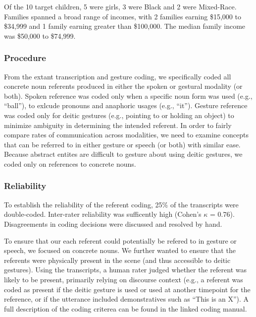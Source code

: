 \documentclass[english,,man,floatsintext]{apa6}
\begin{document}
Of the 10 target children, 5 were girls, 3 were Black and 2 were Mixed-Race. Families spanned a broad range of incomes, with 2 families earning \$15,000 to \$34,999 and 1 family earning greater than \$100,000. The median family income was \$50,000 to \$74,999.

\hypertarget{procedure}{%
\subsubsection{Procedure}\label{procedure}}

From the extant transcription and gesture coding, we specifically coded all concrete noun referents produced in either the spoken or gestural modality (or both). Spoken reference was coded only when a specific noun form was used (e.g., \enquote{ball}), to exlcude pronouns and anaphoric usages (e.g., \enquote{it}). Gesture reference was coded only for deitic gestures (e.g., pointing to or holding an object) to minimize ambiguity in determining the intended referent. In order to fairly compare rates of communication across modalities, we need to examine concepts that can be referred to in either gesture or speech (or both) with similar ease. Because abstract entites are difficult to gesture about using deitic gestures, we coded only on references to concrete nouns.

\hypertarget{reliability}{%
\subsubsection{Reliability}\label{reliability}}

To establish the reliability of the referent coding, 25\% of the transcripts were double-coded. Inter-rater reliability was sufficently high (Cohen's \(\kappa\) = 0.76). Disagreements in coding decisions were discussed and resolved by hand.

To ensure that our each referent could potentially be refered to in gesture or speech, we focused on concrete nouns. We further wanted to ensure that the referents were physically present in the scene (and thus accessible to deitic gestures). Using the transcripts, a human rater judged whether the referent was likely to be present, primarily relying on discourse context (e.g., a referent was coded as present if the deitic gesture is used or used at another timepoint for the reference, or if the utterance included demonstratives such as \enquote{This is an X}). A full description of the coding criterea can be found in the linked coding manual.
\end{document}
